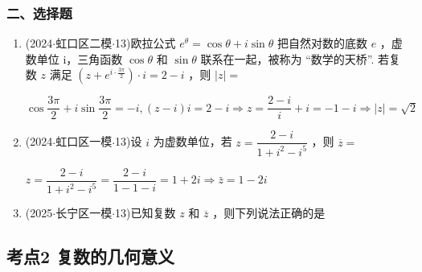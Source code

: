 \subsubsection*{二、选择题}
\begin{enumerate}
    \item (2024$\cdot$虹口区二模$\cdot$13)欧拉公式 ${{e}}^{\theta } = \cos \theta  + {i}\sin \theta$ 把自然对数的底数 ${e}$ ，虚数单位 i，三角函数 $\cos \theta$ 和 $\sin \theta$ 联系在一起，被称为 “数学的天桥”. 若复数 $z$ 满足 $\left( {z + {{e}}^{{i} \cdot  \frac{3\pi }{2}}}\right)  \cdot  {i} = 2 - {i}$ ，则 $\left| z\right|  =$ 
    \begin{jieda}
        $\cos \dfrac{3\pi }{2} + {i}\sin \dfrac{3\pi }{2} =  - {i},\left( {z - {i}}\right) {i} = 2 - {i} \Longrightarrow  z = \dfrac{2 - {i}}{{i}} +  {i} =  - 1 - {i} \Longrightarrow  \left| z\right|  = \sqrt{2}$ 
    \end{jieda}
    \item (2024$\cdot$虹口区一模$\cdot$13)设 ${i}$ 为虚数单位，若 $z = \dfrac{2 - {i}}{1 + {{i}}^{2} - {{i}}^{5}}$ ，则 $\overline{z} =$ 
    \begin{jieda}
        $z = \dfrac{2 - {i}}{1 + {{i}}^{2} - {{i}}^{5}} = \dfrac{2 - {i}}{1 - 1 - {i}} = 1 + 2{i} \Longrightarrow  \bar{z} = 1 - 2{i}$
    \end{jieda}
    \item (2025$\cdot$长宁区一模$\cdot$13)已知复数 $z$ 和 $\overline{z}$ ，则下列说法正确的是 
\end{enumerate}
\subsection*{考点2 复数的几何意义}

